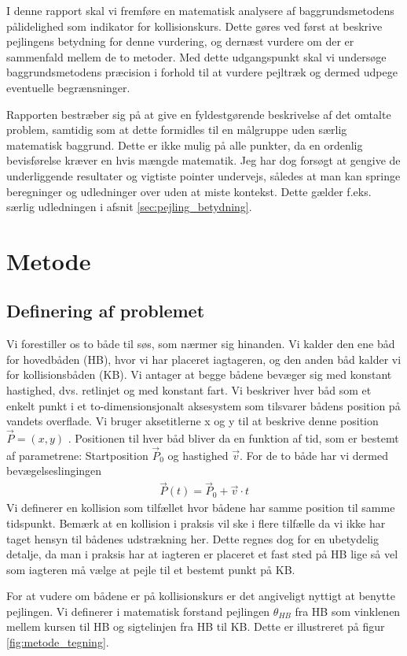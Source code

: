 \documentclass[%
 reprint,
nofootinbib,
aps,
]{revtex4-1}
\begin{document}
I denne rapport skal vi fremføre en matematisk analysere af baggrundsmetodens pålidelighed som indikator for kollisionskurs. Dette gøres ved først at beskrive pejlingens betydning for denne vurdering, og dernæst vurdere om der er sammenfald mellem de to metoder. Med dette udgangspunkt skal vi undersøge baggrundsmetodens præcision i forhold til at vurdere pejltræk og dermed udpege eventuelle begrænsninger.\par
Rapporten bestræber sig på at give en fyldestgørende beskrivelse af det omtalte problem, samtidig som at dette formidles til en målgruppe uden særlig matematisk baggrund. Dette er ikke mulig på alle punkter, da en ordenlig bevisførelse kræver en hvis mængde matematik. Jeg har dog forsøgt at gengive de underliggende resultater og vigtiste pointer undervejs, således at man kan springe beregninger og udledninger over uden at miste kontekst. Dette gælder f.eks. særlig udledningen i afsnit \ref{sec:pejling_betydning}.


\section{Metode}
\subsection{Definering af problemet}
Vi forestiller os to både til søs, som nærmer sig hinanden. Vi kalder den ene båd for hovedbåden (HB), hvor vi har placeret iagtageren, og den anden båd kalder vi for kollisionsbåden (KB). Vi antager at begge bådene bevæger sig med konstant hastighed, dvs. retlinjet og med konstant fart. Vi beskriver hver båd som et enkelt punkt i et to-dimensionsjonalt aksesystem som tilsvarer bådens position på vandets overflade. Vi bruger aksetitlerne x og y til at beskrive denne position $\vec{P} = (x, y)$ . Positionen til hver båd bliver da en funktion af tid, som er bestemt af parametrene: Startposition $\vec{P}_0$ og hastighed $\vec{v}$. For de to både har vi dermed bevægelseslingingen
\begin{align}
  \vec{P}(t) =  \vec{P}_0 + \vec{v}\cdot t
  \label{eq:motion}
\end{align}
Vi definerer en kollision som tilfællet hvor bådene har samme position til samme tidspunkt. Bemærk at en kollision i praksis vil ske i flere tilfælle da vi ikke har taget hensyn til bådenes udstrækning her. Dette regnes dog for en ubetydelig detalje, da man i praksis har at iagteren er placeret et fast sted på HB lige så vel som iagteren må vælge at pejle til et bestemt punkt på KB. \par
For at vudere om bådene er på kollisionskurs er det angiveligt nyttigt at benytte pejlingen. Vi definerer i matematisk forstand pejlingen $\theta_{HB}$ fra HB som vinklenen mellem kursen til HB og sigtelinjen fra HB til KB. Dette er illustreret på figur \ref{fig:metode_tegning}.
\end{document}
